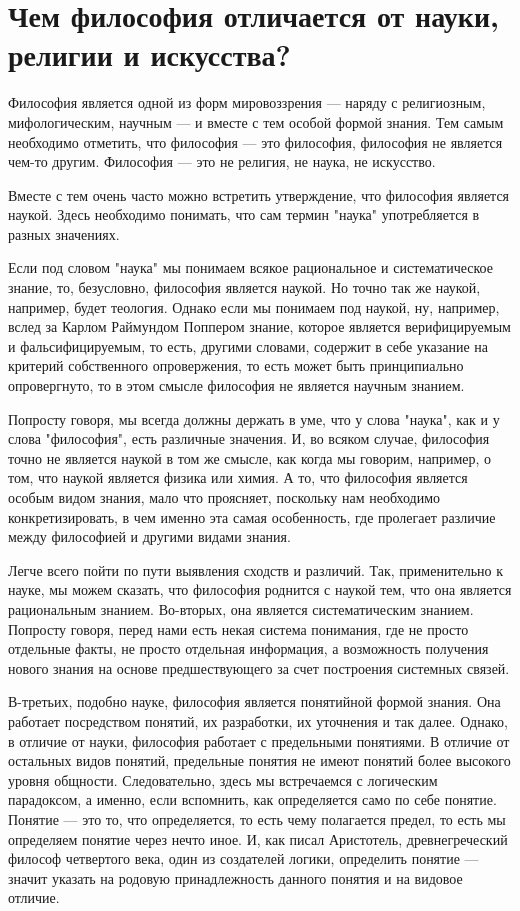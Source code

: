 \documentclass[oneside,final,14pt]{extreport}
\begin{document}
\section{Чем философия отличается от науки, религии и искусства?}


Философия является одной из форм мировоззрения — наряду с религиозным, мифологическим, научным — и вместе с тем особой формой знания. Тем самым необходимо отметить, что философия — это философия, философия не является чем-то другим. Философия — это не религия, не наука, не искусство.

Вместе с тем очень часто можно встретить утверждение, что философия является наукой. Здесь необходимо понимать, что сам термин "наука" употребляется в разных значениях.

Если под словом "наука" мы понимаем всякое рациональное и систематическое знание, то, безусловно, философия является наукой. Но точно так же наукой, например, будет теология. Однако если мы понимаем под наукой, ну, например, вслед за Карлом Раймундом Поппером знание, которое является верифицируемым и фальсифицируемым, то есть, другими словами, содержит в себе указание на критерий собственного опровержения, то есть может быть принципиально опровергнуто, то в этом смысле философия не является научным знанием.

Попросту говоря, мы всегда должны держать в уме, что у слова "наука", как и у слова "философия", есть различные значения. И, во всяком случае, философия точно не является наукой в том же смысле, как когда мы говорим, например, о том, что наукой является физика или химия. А то, что философия является особым видом знания, мало что проясняет, поскольку нам необходимо конкретизировать, в чем именно эта самая особенность, где пролегает различие между философией и другими видами знания.

Легче всего пойти по пути выявления сходств и различий. Так, применительно к науке, мы можем сказать, что философия роднится с наукой тем, что она является рациональным знанием. Во-вторых, она является систематическим знанием. Попросту говоря, перед нами есть некая система понимания, где не просто отдельные факты, не просто отдельная информация, а возможность получения нового знания на основе предшествующего за счет построения системных связей. 

В-третьих, подобно науке, философия является понятийной формой знания. Она работает посредством понятий, их разработки, их уточнения и так далее. Однако, в отличие от науки, философия работает с предельными понятиями. В отличие от остальных видов понятий, предельные понятия не имеют понятий более высокого уровня общности. Следовательно, здесь мы встречаемся с логическим парадоксом, а именно, если вспомнить, как определяется само по себе понятие. Понятие — это то, что определяется, то есть чему полагается предел, то есть мы определяем понятие через нечто иное. И, как писал Аристотель, древнегреческий философ четвертого века, один из создателей логики, определить понятие — значит указать на родовую принадлежность данного понятия и на видовое отличие.
\end{document}
